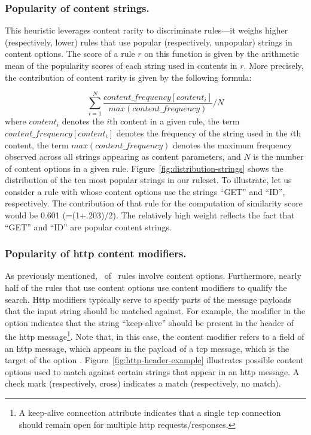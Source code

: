 \documentclass[conference]{IEEEtran}
\begin{document}
\subsubsection{Popularity of content strings.} 
This heuristic leverages content rarity to discriminate rules---it
weighs higher (respectively, lower) rules that use popular
(respectively, unpopular) strings in content options. The score of a
rule $r$ on this function is given by the arithmetic mean of the
popularity scores of each string used in contents in $r$. More
precisely, the contribution of content rarity is given by the
following formula:

{\small
\vspace{-1.5ex}
\[\sum_{i=1}^{N}\frac{\mathit{content\_frequency[content_i]}}{\mathit{max(content\_frequency)}}/N\]
\vspace{-0.5ex}
}
\noindent
where $\mathit{content_i}$ denotes the $i$th content in a given
rule, the term $\mathit{content\_frequency[\mathit{content_i}]}$
denotes the frequency of the string used in the $i$th content, the
term $\mathit{max(content\_frequency)}$ denotes the maximum frequency
observed across all strings appearing as content parameters, and $N$
is the number of content options in a given
rule. Figure~\ref{fig:distribution-strings} shows the distribution of
the ten most popular strings in our ruleset. To illustrate, let us
consider a rule with whose content options use the strings ``GET'' and
``ID'', respectively. The contribution of that rule for the
computation of similarity score would be 0.601 (=(1+.203)/2). The
relatively high weight reflects the fact that ``GET'' and ``ID'' are
popular content strings.

\subsubsection{\label{sec:popularity-content-modifiers}Popularity of http content modifiers.} As previously
mentioned, \percRulesWithContent\ of \suri\ rules involve content
options. Furthermore, nearly half of the rules that use content
options use content modifiers to qualify the search. Http modifiers
typically serve to specify parts of the message payloads that the
input string should be matched against. For example, the modifier
 in the option  indicates that the string ``keep-alive'' should be
present in the header of the http message\footnote{A keep-alive
  connection attribute indicates that a single tcp connection should
  remain open for multiple http requests/responses.}. Note that, in
this case, the content modifier refers to a field of an http message,
which appears in the payload of a tcp message, which is the target of
the option . Figure~\ref{fig:http-header-example}
illustrates possible content options used to match against certain
strings that appear in an http message. A check mark (respectively,
cross) indicates a match (respectively, no match).
\end{document}
